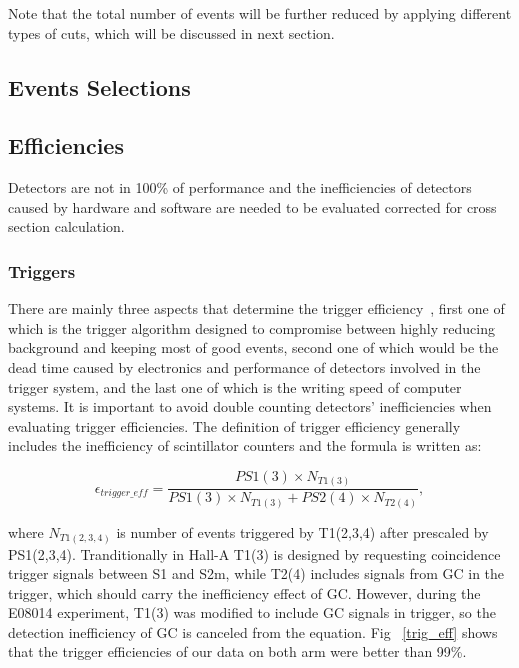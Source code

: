 \documentclass[a4paper,10.5pt]{article}
\begin{document}
Note that the total number of events will be further reduced by applying different types of cuts, which will be discussed in next section.

\subsection{Events Selections}
  


\subsection{Efficiencies}
Detectors are not in 100\% of performance and the inefficiencies of detectors caused by hardware and software are needed to be evaluated corrected for cross section calculation. 

\subsubsection{Triggers}

 There are mainly three aspects that determine the trigger efficiency~\cite{R_Bock}, first one of which is the trigger algorithm designed to compromise between highly reducing background and keeping most of good events, second one of which would be the dead time caused by electronics and performance of detectors involved in the trigger system, and the last one of which is the writing speed of computer systems. It is important to avoid double counting detectors' inefficiencies when evaluating trigger efficiencies. The definition of trigger efficiency generally includes the inefficiency of scintillator counters and the formula is written as:

\begin{equation}
 \epsilon_{trigger\_eff} = \frac{PS1(3)\times N_{T1(3)}}{PS1(3) \times N_{T1(3)}+PS2(4)\times N_{T2(4)}},
 \label{trigger_eff}
\end{equation}

where $N_{T1(2,3,4)}$ is number of events triggered by T1(2,3,4) after prescaled by PS1(2,3,4). Tranditionally in Hall-A T1(3) is designed by requesting coincidence trigger signals between S1 and S2m, while T2(4) includes signals from GC in the trigger, which should carry the inefficiency effect of GC. However, during the E08014 experiment, T1(3) was modified to include GC signals in trigger, so the detection inefficiency of GC is canceled from the equation. Fig ~\ref{trig_eff} shows that the trigger efficiencies of our data on both arm were better than 99\%.
\end{document}
